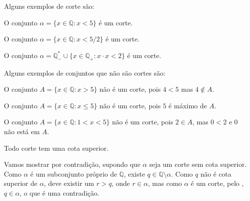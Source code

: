 \documentclass[../main.tex]{subfiles}
\begin{document}
Alguns exemplos de corte são:

\begin{ex}
    O conjunto $\alpha = \{ x \in \mathbb{Q} : x < 5 \}$ é um corte.
\end{ex}
\begin{ex}
    O conjunto $\alpha = \{ x \in \mathbb{Q} : x < 5/2 \}$ é um corte.
\end{ex}
\begin{ex}
    O conjunto $\alpha =  \mathbb{Q}_{-}^* \cup \{ x \in \mathbb{Q_{+}} : x \cdot x < 2 \} $ é um corte.
\end{ex}

Alguns exemplos de conjuntos que não são cortes são:
\begin{ex}
    O conjunto $A = \{ x \in \mathbb{Q} : x > 5 \}$ não é um corte, pois $4 < 5$ mas $4 \not\in A$.
\end{ex}
\begin{ex}
    O conjunto $A = \{ x \in \mathbb{Q} : x \leq 5 \}$ não é um corte, pois $5$ é máximo de $A$.
\end{ex}
\begin{ex}
    O conjunto $A = \{ x \in \mathbb{Q} : 1 < x < 5 \}$ não é um corte, pois $2 \in A$, mas $0 < 2$ e $0$ não está em $A$.
\end{ex}

\begin{teo}
    Todo corte tem uma cota superior.
\end{teo}
\begin{dem}
    Vamos mostrar por contradição, supondo que $\alpha$ seja um corte sem cota superior.
    Como $\alpha$ é um subconjunto próprio de $\mathbb{Q}$, existe $q \in \mathbb{Q} \setminus \alpha$. Como $q$ não é cota superior de $\alpha$, deve existir um $r > q$, onde $r \in \alpha$, mas como $\alpha$ é um corte, pelo , $q \in \alpha$, o que é uma contradição.
\end{dem}
\end{document}
